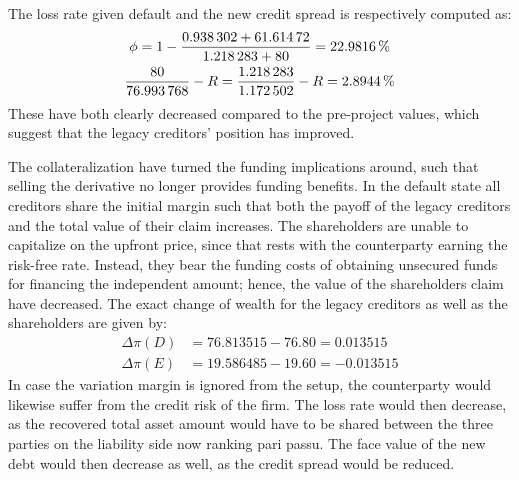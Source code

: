 \documentclass[../main.tex]{subfiles}
\begin{document}
        The loss rate given default and the new credit spread is respectively computed as:
            \begin{gather}
                \phi 
                = 
                    1 
                    - 
                    \frac{
                        \num{0.938302}+\num{61.61472}
                    }{
                        \num{1.218283}+\num{80}
                    }
                = 
                    \pct{0.229816}
                \\
                    \frac{
                        \num{80}    
                    }{
                        \num{76.993768} 
                    } 
                    - 
                    \grossrfrate 
                = 
                    \frac{
                        \num{1.218283}
                    }{        
                        \num{1.172502} 
                    } 
                    -
                    \grossrfrate 
                = 
                    \pct{0.028944} 
            \end{gather}
        These have both clearly decreased compared to the pre-project values, 
        which suggest that the legacy creditors' position has improved.

        The collateralization have turned the funding implications around,
        such that selling the derivative no longer provides funding benefits.
        In the default state all creditors share the initial margin 
        such that both the payoff of the legacy creditors and the total value of their claim increases.
        The shareholders are unable to capitalize on the upfront price,
        since that rests with the counterparty earning the risk-free rate.
        Instead, they bear the funding costs of obtaining unsecured funds 
        for financing the independent amount;
        hence, the value of the shareholders claim have decreased.
        The exact change of wealth for the legacy creditors as well as the shareholders are given by:
        \begin{align}
            \Delta \pi(D) &= \num{76.813515} - \num{76.80} = \num{0.013515}\\
            \Delta \pi(E) &= \num{19.586485} - \num{19.60} = \num{-0.013515}
        \end{align}
        In case the variation margin is ignored from the setup, the counterparty would likewise suffer from the credit risk of the firm.
        The loss rate would then decrease,
        as the recovered total asset amount would have to be shared between the three parties on the liability side now ranking pari passu.
        The face value of the new debt would then decrease as well, as the credit spread would be reduced.
\end{document}
